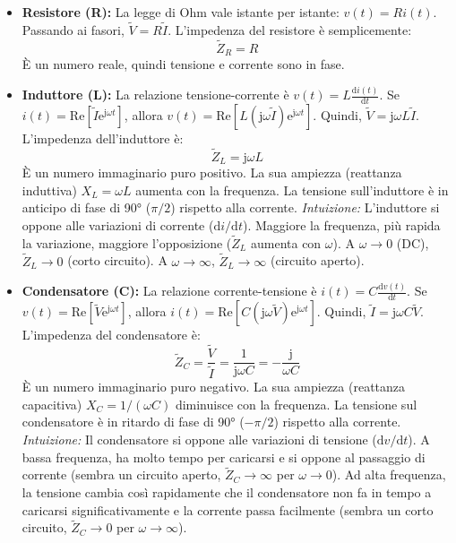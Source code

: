 \documentclass[a4paper, 11pt]{article}
\newcommand{\jj}{\mathrm{j}} %
\newcommand{\ee}{\mathrm{e}} %
\newcommand{\dd}{\mathrm{d}} %
\begin{document}
\begin{itemize}
    \item \textbf{Resistore (R):} La legge di Ohm vale istante per istante: $v(t) = R i(t)$. Passando ai fasori, $\tilde{V} = R \tilde{I}$. L'impedenza del resistore è semplicemente:
        \begin{equation}
            \tilde{Z}_R = R
        \end{equation}
        È un numero reale, quindi tensione e corrente sono in fase.

    \item \textbf{Induttore (L):} La relazione tensione-corrente è $v(t) = L \frac{\dd i(t)}{\dd t}$. Se $i(t) = \text{Re}[\tilde{I} \ee^{\jj \omega t}]$, allora $v(t) = \text{Re}[L (\jj \omega \tilde{I}) \ee^{\jj \omega t}]$. Quindi, $\tilde{V} = \jj \omega L \tilde{I}$. L'impedenza dell'induttore è:
        \begin{equation}
            \tilde{Z}_L = \jj \omega L
        \end{equation}
        È un numero immaginario puro positivo. La sua ampiezza (reattanza induttiva) $X_L = \omega L$ aumenta con la frequenza. La tensione sull'induttore è in anticipo di fase di 90° ($\pi/2$) rispetto alla corrente. \textit{Intuizione:} L'induttore si oppone alle variazioni di corrente ($\dd i / \dd t$). Maggiore la frequenza, più rapida la variazione, maggiore l'opposizione ($\tilde{Z}_L$ aumenta con $\omega$). A $\omega \to 0$ (DC), $\tilde{Z}_L \to 0$ (corto circuito). A $\omega \to \infty$, $\tilde{Z}_L \to \infty$ (circuito aperto).

    \item \textbf{Condensatore (C):} La relazione corrente-tensione è $i(t) = C \frac{\dd v(t)}{\dd t}$. Se $v(t) = \text{Re}[\tilde{V} \ee^{\jj \omega t}]$, allora $i(t) = \text{Re}[C (\jj \omega \tilde{V}) \ee^{\jj \omega t}]$. Quindi, $\tilde{I} = \jj \omega C \tilde{V}$. L'impedenza del condensatore è:
        \begin{equation}
            \tilde{Z}_C = \frac{\tilde{V}}{\tilde{I}} = \frac{1}{\jj \omega C} = -\frac{\jj}{\omega C}
        \end{equation}
        È un numero immaginario puro negativo. La sua ampiezza (reattanza capacitiva) $X_C = 1/(\omega C)$ diminuisce con la frequenza. La tensione sul condensatore è in ritardo di fase di 90° ($-\pi/2$) rispetto alla corrente. \textit{Intuizione:} Il condensatore si oppone alle variazioni di tensione ($\dd v / \dd t$). A bassa frequenza, ha molto tempo per caricarsi e si oppone al passaggio di corrente (sembra un circuito aperto, $\tilde{Z}_C \to \infty$ per $\omega \to 0$). Ad alta frequenza, la tensione cambia così rapidamente che il condensatore non fa in tempo a caricarsi significativamente e la corrente passa facilmente (sembra un corto circuito, $\tilde{Z}_C \to 0$ per $\omega \to \infty$).
\end{itemize}
\end{document}
